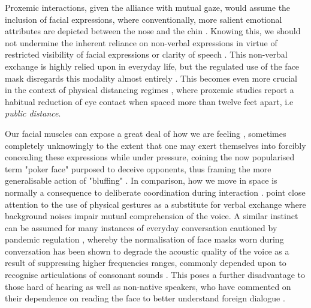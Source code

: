 Proxemic interactions, given the alliance with mutual gaze, would assume the inclusion of facial expressions, where conventionally, more salient emotional attributes are depicted between the nose and the chin \citep{fischer_veiled_2012,blais_eyes_2012}. Knowing this, we should not undermine the inherent reliance on non-verbal expressions in virtue of restricted visibility of facial expressions or clarity of speech \citep{trujillo_speakers_2021}. This non-verbal exchange is highly relied upon in everyday life, but the regulated use of the face mask disregards this modality almost entirely \citep{carbon_wearing_2020}. This becomes even more crucial in the context of physical distancing regimes \citep{campagne_problem_2021}, where proxemic studies report a habitual reduction of eye contact when spaced more than twelve feet apart, i.e \textit{public distance}\citep{baldassare_cultural_1975}.

Our facial muscles can expose a great deal of how we are feeling \citep{qian_effects_2018,todorov_face_2017}, sometimes completely unknowingly to the extent that one may exert themselves into forcibly concealing these expressions while under pressure, coining the now popularised term "poker face" purposed to deceive opponents, thus framing the more generalisable action of "bluffing" \citep{billings_challenge_2002}. In comparison, how we move in space is normally a consequence to deliberate coordination during interaction \citep{poyatos_interactive_1980,jones_communication_2016}. \citeauthor{hadley_synchrony_2021} \citeyear{hadley_synchrony_2021} point close attention to the use of physical gestures as a substitute for verbal exchange where background noises impair mutual comprehension of the voice. A similar instinct can be assumed for many instances of everyday conversation cautioned by pandemic regulation \citep{campagne_problem_2021}, whereby the normalisation of face masks worn during conversation has been shown to degrade the acoustic quality of the voice as a result of suppressing higher frequencies ranges, commonly depended upon to recognise articulations of consonant sounds \citep{saunders_impacts_2021,rahne_influence_2021,nobrega_how_2020}. This poses a further disadvantage to those hard of hearing \citep{mckee_overcoming_2020} as well as non-native speakers, who have commented on their dependence on reading the face to better understand foreign dialogue \citep{inceoglu_language_2021,jabber_non-verbal_2020}. 
 
